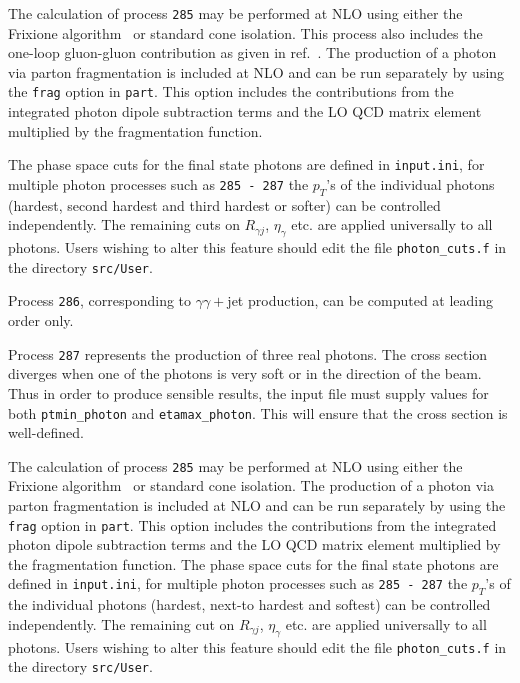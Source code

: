The calculation of process {\tt 285} may be performed at NLO using either the
Frixione algorithm~\cite{Frixione:1998jh} or standard cone isolation.  This process also includes
the one-loop gluon-gluon contribution as given in
ref.~\cite{Bern:2002jx}.  The production of a photon via parton fragmentation is included at NLO and 
can be run separately by using the {\tt frag} option in {\tt part}. This option includes the contributions from the 
integrated 
photon dipole subtraction terms and the LO QCD matrix element multiplied by the fragmentation function.  


The phase space cuts for the final state photons are defined in {\tt{input.ini}}, for multiple photon processes such 
as {\tt 285 - 287} the $p_T$'s of the individual photons (hardest, second hardest and third hardest or softer) can be 
controlled independently. 
The remaining cuts on $R_{\gamma j}$, $\eta_{\gamma}$ etc. are applied universally to all photons. Users wishing to 
alter
this feature should edit the file {\tt{photon\_cuts.f}} in the directory {\tt{src/User}}. 


Process {\tt 286}, corresponding to $\gamma\gamma+$jet production, can be computed at leading order only.

\label{subsec:trigam}

Process {\tt 287} represents the production of three real photons.
The cross section diverges
when one of the photons is very soft or in the direction of the beam.
Thus in order to produce sensible results, the input file must supply values for both
{\tt ptmin\_photon} and {\tt etamax\_photon}. This will ensure that
the cross section is well-defined.

The calculation of process {\tt 285} may be performed at NLO using either the
Frixione algorithm~\cite{Frixione:1998jh} or standard cone isolation.  The production of a photon via parton 
fragmentation is included at NLO and 
can be run separately by using the {\tt frag} option in {\tt part}. This option includes the contributions from the 
integrated 
photon dipole subtraction terms and the LO QCD matrix element multiplied by the fragmentation function.  
The phase space cuts for the final state photons are defined in {\tt{input.ini}}, for multiple photon processes such 
as {\tt 285 - 287} the $p_T$'s of the individual photons (hardest, next-to hardest and softest) can be controlled 
independently. 
The remaining cut on $R_{\gamma j}$, $\eta_{\gamma}$ etc. are applied universally to all photons. Users wishing to alter
this feature should edit the file {\tt{photon\_cuts.f}} in the directory {\tt{src/User}}. 


